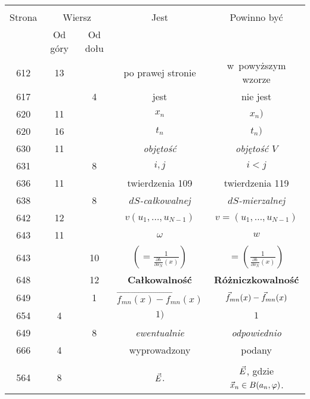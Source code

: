 \documentclass[a4paper,11pt]{article}
\numberwithin{equation}{section}
\begin{document}
\begin{center}
  \begin{tabular}{|c|c|c|c|c|}
    \hline
    & \multicolumn{2}{c|}{} & & \\
    Strona & \multicolumn{2}{c|}{Wiersz} & Jest
                              & Powinno być \\ \cline{2-3}
    & Od góry & Od dołu & & \\
    \hline
    612 & 13 & & po prawej stronie & w~powyższym wzorze \\
    617 & &  4 & jest & nie jest \\
    620 & 11 & & $x_{ n }$ & $x_{ n } )$ \\
    620 & 16 & & $t_{ n }$ & $t_{ n } )$ \\
    630 & 11 & & \textit{objętość} & \textit{objętość $V$} \\
    631 & &  8 & $i, j$ & $i < j$ \\
    636 & 11 & & twierdzenia 109 & twierdzenia 119 \\
    638 & &  8 & \textit{$dS$-całkowalnej} & \textit{$dS$-mierzalnej} \\
    642 & 12 & & $v( u_{ 1 }, \ldots, u_{ N - 1 } )$
           & $v = ( u_{ 1 }, \ldots, u_{ N - 1 } )$ \\
    643 & 11 & & $\omega$ & $w$ \\
    643 & & 10 & $\left( = \frac{ 1 }{
                 \frac{ \partial h }{ \partial x_{ N } }( x ) } \right)$
           & $= \left( \frac{ 1 }{
             \frac{ \partial h }{ \partial x_{ N } }( x ) } \right)$ \\
    648 & & 12 & \textbf{Całkowalność}
           & \textbf{Różniczkowalność} \\
    649 & &  1 & $\overrightarrow{ f_{ m n }( x ) - f_{ m n }( x ) }$
           & $\vec{f}_{ m n }( x ) - \vec{f}_{ m n }( x )$ \\
    654 &  4 & & $1 )$ & $1$ \\
    649 & &  8 & \textit{ewentualnie} & \textit{odpowiednio} \\
    666 &  4 & & wyprowadzony & podany \\
    & & & & \\
    564 &  8 & & $\vec{E}$.
           & $\vec{E}$, gdzie $\vec{x}_{ n } \in B( a_{ n }, \varphi )$. \\
    \hline
  \end{tabular}

\end{center}
\end{document}
